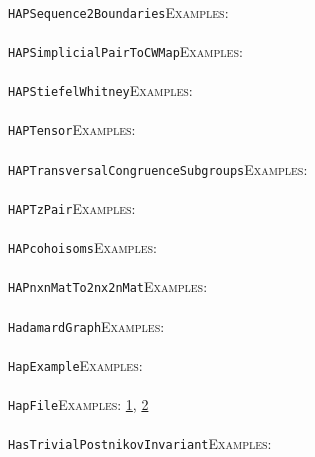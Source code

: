 \documentclass[a4paper,11pt]{report}
\begin{document}
{{ \\
 \texttt{HAP{\textunderscore}Sequence2Boundaries}{\nobreakspace}{\nobreakspace}{\nobreakspace}{\nobreakspace}\textsc{Examples:} \\
 \\
 \texttt{HAP{\textunderscore}SimplicialPairToCWMap}{\nobreakspace}{\nobreakspace}{\nobreakspace}{\nobreakspace}\textsc{Examples:} \\
 \\
 \texttt{HAP{\textunderscore}StiefelWhitney}{\nobreakspace}{\nobreakspace}{\nobreakspace}{\nobreakspace}\textsc{Examples:} \\
 \\
 \texttt{HAP{\textunderscore}Tensor}{\nobreakspace}{\nobreakspace}{\nobreakspace}{\nobreakspace}\textsc{Examples:} \\
 \\
 \texttt{HAP{\textunderscore}TransversalCongruenceSubgroups}{\nobreakspace}{\nobreakspace}{\nobreakspace}{\nobreakspace}\textsc{Examples:} \\
 \\
 \texttt{HAP{\textunderscore}TzPair}{\nobreakspace}{\nobreakspace}{\nobreakspace}{\nobreakspace}\textsc{Examples:} \\
 \\
 \texttt{HAP{\textunderscore}coho{\textunderscore}isoms}{\nobreakspace}{\nobreakspace}{\nobreakspace}{\nobreakspace}\textsc{Examples:} \\
 \\
 \texttt{HAP{\textunderscore}nxnMatTo2nx2nMat}{\nobreakspace}{\nobreakspace}{\nobreakspace}{\nobreakspace}\textsc{Examples:} \\
 \\
 \texttt{HadamardGraph}{\nobreakspace}{\nobreakspace}{\nobreakspace}{\nobreakspace}\textsc{Examples:} \\
 \\
 \texttt{HapExample}{\nobreakspace}{\nobreakspace}{\nobreakspace}{\nobreakspace}\textsc{Examples:} \\
 \\
 \texttt{HapFile}{\nobreakspace}{\nobreakspace}{\nobreakspace}{\nobreakspace}\textsc{Examples:} \href{tutorial/chap2.html} {1}{\nobreakspace}, \href{tutorial/chap4.html} {2}{\nobreakspace} \\
 \\
 \texttt{HasTrivialPostnikovInvariant}{\nobreakspace}{\nobreakspace}{\nobreakspace}{\nobreakspace}\textsc{Examples:} \\
 \\
}}
\end{document}
